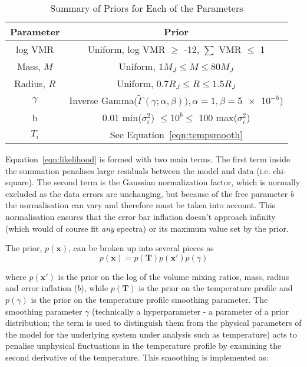 \documentclass[11pt, a4paper,titlepage]{report}
\begin{document}
\begin{table}[t]
\centering
\caption{Summary of Priors for Each of the Parameters}
\label{tbl:priors}
\begin{tabular}{cc}
\hline
Parameter & Prior \\
\hline
log VMR &  Uniform, log VMR $\ge$ -12, $\sum$ VMR $\le$ 1\\
Mass, $M$ & Uniform, $1M_{J} \le M \le 80M_{J}$ \\
Radius, $R$ & Uniform, $0.7R_{J} \le R \le 1.5R_{J}$ \\
$\gamma$  & Inverse Gamma($\tilde{\Gamma}(\gamma; \alpha, \beta)), \alpha = 1, \beta = \num{5e-5}$)  \\
b & 0.01 min($\sigma_i^2$) $\le 10^b \le$ 100 max($\sigma_i^2$) \\
$T_i$ & See Equation~\eqref{eqn:tempsmooth} \\
\end{tabular}
\end{table}

Equation~\ref{eqn:likelihood} is formed with two main terms. The first term inside the summation penalises large residuals between the model and data (i.e. chi-square). The second term is the Gaussian normalization factor, which is normally excluded as the data errors are unchanging, but because of the free parameter $b$ the normalisation can vary and therefore must be taken into account. This normalisation ensures that the error bar inflation doesn't approach infinity (which would of course fit \textit{any} spectra) or its maximum value set by the prior. 

The prior, $p(\bm{x})$, can be broken up into several pieces as
\begin{equation}
p(\bm{x}) = p(\bm{T}) p(\bm{x'}) p(\gamma)
\end{equation}

where $p(\bm{x'})$ is the prior on the log of the volume mixing ratios, mass, radius and error inflation ($b$), while $p(\bm{T})$ is the prior on the temperature profile and $p(\gamma)$ is the prior on the temperature profile smoothing parameter. The smoothing parameter $\gamma$ (technically a hyperparameter - a parameter of a prior distribution; the term is used to distinguish them from the physical parameters of the model for the underlying system under analysis such as temperature) acts to penalise unphysical fluctuations in the temperature profile by examining the second derivative of the temperature. This smoothing is implemented as:
\end{document}
